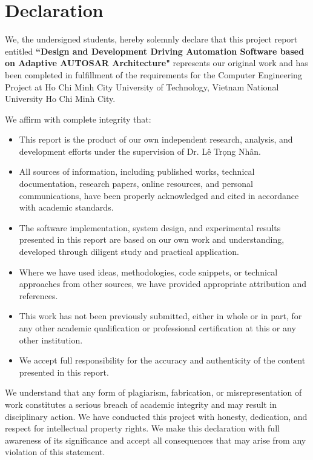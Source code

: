 \chapter*{Declaration}


We, the undersigned students, hereby solemnly declare that this project report entitled \textbf{``Design and Development Driving Automation Software based on Adaptive AUTOSAR Architecture"} represents our original work and has been completed in fulfillment of the requirements for the Computer Engineering Project at Ho Chi Minh City University of Technology, Vietnam National University Ho Chi Minh City.

We affirm with complete integrity that:

\begin{itemize}
    \item This report is the product of our own independent research, analysis, and development efforts under the supervision of Dr. Lê Trọng Nhân.
    
    \item All sources of information, including published works, technical documentation, research papers, online resources, and personal communications, have been properly acknowledged and cited in accordance with academic standards.
    
    \item The software implementation, system design, and experimental results presented in this report are based on our own work and understanding, developed through diligent study and practical application.
    
    \item Where we have used ideas, methodologies, code snippets, or technical approaches from other sources, we have provided appropriate attribution and references.
    
    \item This work has not been previously submitted, either in whole or in part, for any other academic qualification or professional certification at this or any other institution.
    
    \item We accept full responsibility for the accuracy and authenticity of the content presented in this report.
\end{itemize}

We understand that any form of plagiarism, fabrication, or misrepresentation of work constitutes a serious breach of academic integrity and may result in disciplinary action. We have conducted this project with honesty, dedication, and respect for intellectual property rights. We make this declaration with full awareness of its significance and accept all consequences that may arise from any violation of this statement.

